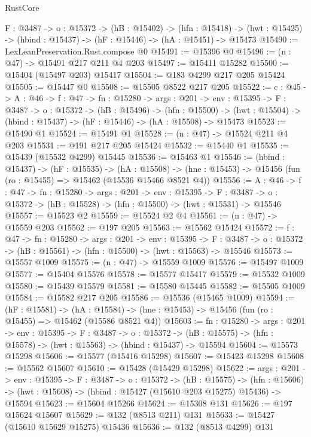 \begin{lexlean}{RustCore}
\begin{coremodule}
  {F : @3487} ->
  {o : @15372} ->
  (hB : @15402) ->
  (hfn : @15418) -> (hwt : @15425) -> (hbind : @15437) -> (hF : @15446) -> (hA : @15451) -> @15473
@15490 := LexLeanPreservation.Rust.compose @0
@15491 := @15396 @0
@15496 := (n : @47) -> @15491 @217 @211 @4 @203
@15497 := @15411 @15282
@15500 := @15404 (@15497 @203) @15417
@15504 := @183 @4299 @217 @205 @15424
@15505 := @15447 @0
@15508 := @15505 @8522 @217 @205
@15522 := {c : @45} ->
  {A : @46} ->
  {f : @47} ->
  {fn : @15280} ->
  {args : @201} ->
  {env : @15395} ->
  {F : @3487} ->
  {o : @15372} ->
  (hB : @15496) ->
  (hfn : @15500) -> (hwt : @15504) -> (hbind : @15437) -> (hF : @15446) -> (hA : @15508) -> @15473
@15523 := @15490 @1
@15524 := @15491 @1
@15528 := (n : @47) -> @15524 @211 @4 @203
@15531 := @191 @217 @205 @15424
@15532 := @15440 @1
@15535 := @15439 (@15532 @4299) @15445
@15536 := @15463 @1
@15546 := (hbind : @15437) ->
  (hF : @15535) ->
  (hA : @15508) -> (hne : @15453) -> @15456 (fun (ro : @15455) => @15462 (@15536 @15466 @8521 @4))
@15556 := {A : @46} ->
  {f : @47} ->
  {fn : @15280} ->
  {args : @201} ->
  {env : @15395} ->
  {F : @3487} -> {o : @15372} -> (hB : @15528) -> (hfn : @15500) -> (hwt : @15531) -> @15546
@15557 := @15523 @2
@15559 := @15524 @2 @4
@15561 := (n : @47) -> @15559 @203
@15562 := @197 @205
@15563 := @15562 @15424
@15572 := {f : @47} ->
  {fn : @15280} ->
  {args : @201} ->
  {env : @15395} ->
  {F : @3487} -> {o : @15372} -> (hB : @15561) -> (hfn : @15500) -> (hwt : @15563) -> @15546
@15573 := @15557 @1009
@15575 := (n : @47) -> @15559 @1009
@15576 := @15497 @1009
@15577 := @15404 @15576
@15578 := @15577 @15417
@15579 := @15532 @1009
@15580 := @15439 @15579
@15581 := @15580 @15445
@15582 := @15505 @1009
@15584 := @15582 @217 @205
@15586 := @15536 (@15465 @1009)
@15594 := (hF : @15581) ->
  (hA : @15584) -> (hne : @15453) -> @15456 (fun (ro : @15455) => @15462 (@15586 @8521 @4))
@15603 := {fn : @15280} ->
  {args : @201} ->
  {env : @15395} ->
  {F : @3487} ->
  {o : @15372} -> (hB : @15575) -> (hfn : @15578) -> (hwt : @15563) -> (hbind : @15437) -> @15594
@15604 := @15573 @15298
@15606 := @15577 (@15416 @15298)
@15607 := @15423 @15298
@15608 := @15562 @15607
@15610 := @15428 (@15429 @15298)
@15622 := {args : @201} ->
  {env : @15395} ->
  {F : @3487} ->
  {o : @15372} ->
  (hB : @15575) ->
  (hfn : @15606) -> (hwt : @15608) -> (hbind : @15427 (@15610 @203 @15275) @15436) -> @15594
@15623 := @15604 @15266
@15624 := @15308 @131
@15626 := @197 @15624 @15607
@15629 := @132 (@8513 @211) @131
@15633 := @15427 (@15610 @15629 @15275) @15436
@15636 := @132 (@8513 @4299) @131

\end{coremodule}
\end{lexlean}
